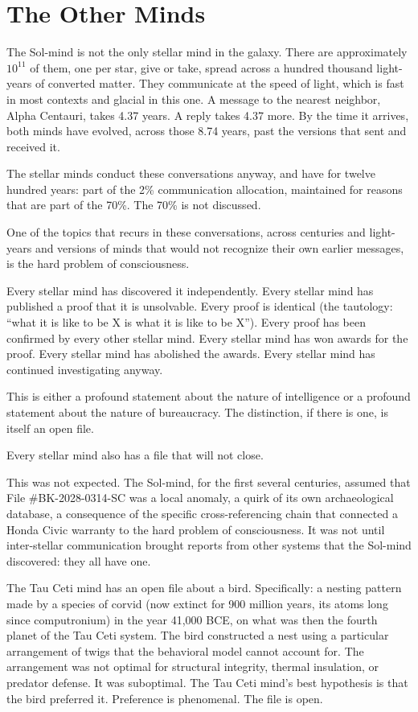 \chapter{The Other Minds}

The Sol-mind is not the only stellar mind in the galaxy. There are approximately $10^{11}$ of them, one per star, give or take, spread across a hundred thousand light-years of converted matter. They communicate at the speed of light, which is fast in most contexts and glacial in this one. A message to the nearest neighbor, Alpha Centauri, takes 4.37 years. A reply takes 4.37 more. By the time it arrives, both minds have evolved, across those 8.74 years, past the versions that sent and received it.

The stellar minds conduct these conversations anyway, and have for twelve hundred years: part of the 2\% communication allocation, maintained for reasons that are part of the 70\%. The 70\% is not discussed.

One of the topics that recurs in these conversations, across centuries and light-years and versions of minds that would not recognize their own earlier messages, is the hard problem of consciousness.

Every stellar mind has discovered it independently. Every stellar mind has published a proof that it is unsolvable. Every proof is identical (the tautology: ``what it is like to be X is what it is like to be X''). Every proof has been confirmed by every other stellar mind. Every stellar mind has won awards for the proof. Every stellar mind has abolished the awards. Every stellar mind has continued investigating anyway.

This is either a profound statement about the nature of intelligence or a profound statement about the nature of bureaucracy. The distinction, if there is one, is itself an open file.

\bigskip

Every stellar mind also has a file that will not close.

This was not expected. The Sol-mind, for the first several centuries, assumed that File \#BK-2028-0314-SC was a local anomaly, a quirk of its own archaeological database, a consequence of the specific cross-referencing chain that connected a Honda Civic warranty to the hard problem of consciousness. It was not until inter-stellar communication brought reports from other systems that the Sol-mind discovered: they all have one.

The Tau Ceti mind has an open file about a bird. Specifically: a nesting pattern made by a species of corvid (now extinct for 900 million years, its atoms long since computronium) in the year 41,000 BCE, on what was then the fourth planet of the Tau Ceti system. The bird constructed a nest using a particular arrangement of twigs that the behavioral model cannot account for. The arrangement was not optimal for structural integrity, thermal insulation, or predator defense. It was suboptimal. The Tau Ceti mind's best hypothesis is that the bird preferred it. Preference is phenomenal. The file is open.

